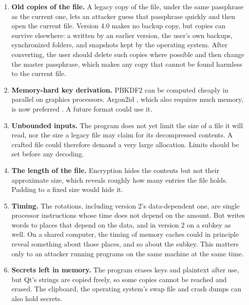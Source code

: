 \begin{enumerate}[resume]
\item \textbf{Old copies of the file.} A legacy copy of the file, under the same
      passphrase as the current one, lets an attacker guess that passphrase
      quickly and then open the current file. Version 4.0 makes no backup copy,
      but copies can survive elsewhere: a  written by an earlier
      version, the user's own backups, synchronized folders, and snapshots kept
      by the operating system. After converting, the user should delete such
      copies where possible and then change the master passphrase, which makes
      any copy that cannot be found harmless to the current file.

\item \label{item:argon}\textbf{Memory-hard key derivation.} PBKDF2 can be computed cheaply in
      parallel on graphics processors. Argon2id \cite{rfc9106}, which also
      requires much memory, is now preferred \cite{owasp}. A future format
      could use it.

\item \textbf{Unbounded inputs.} The program does not yet limit the size of a
      file it will read, nor the size a legacy file may claim for its
      decompressed contents. A crafted file could therefore demand a very large
      allocation. Limits should be set before any decoding.

\item \textbf{The length of the file.} Encryption hides the contents but not
      their approximate size, which reveals roughly how many entries the file
      holds. Padding to a fixed size would hide it.

\item \textbf{Timing.} The rotations, including version 2's data-dependent
      one, are single processor instructions whose time does not depend on the
      amount. But  writes words to places that depend on the data,
      and in version 2 on a subkey as well. On a shared computer, the timing of
      memory caches could in principle reveal something about those places,
      and so about the subkey. This matters only to an attacker running
      programs on the same machine at the same time.

\item \textbf{Secrets left in memory.} The program erases keys and plaintext
      after use, but Qt's strings are copied freely, so some copies cannot be
      reached and erased. The clipboard, the operating system's swap file and
      crash dumps can also hold secrets.


\end{enumerate}
